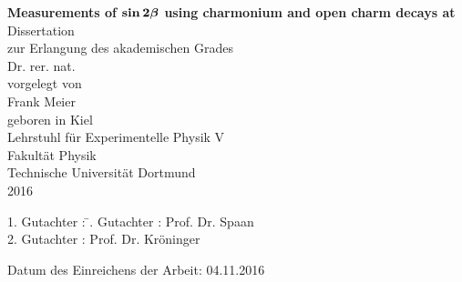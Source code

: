 
\thispagestyle{empty}
\vspace*{4.0cm}

\begin{center}
\Huge\textbf{
  Measurements of $\boldsymbol{\sin 2\beta}$ using charmonium and open charm decays at \lhcb
}
\vfill
\Large
Dissertation \\ zur Erlangung des akademischen Grades \\ Dr. rer. nat. \\
\vspace{20pt}
\normalsize
vorgelegt von \\[5pt]
{\Large Frank Meier} \\[5pt]
geboren in Kiel \\
\vspace{20pt}
Lehrstuhl f\"ur Experimentelle Physik V \\ Fakult\"at Physik \\
Technische Universit\"at Dortmund \\ 2016

\end{center}
\newpage



\thispagestyle{empty}
\vspace*{\fill}
\begin{tabbing}
1. Gutachter : \=. Gutachter : \>Prof. Dr. Spaan \\[11pt]
2. Gutachter : \>Prof. Dr. Kröninger
\end{tabbing}
\vspace{11pt}
Datum des Einreichens der Arbeit: 04.11.2016
\newpage
